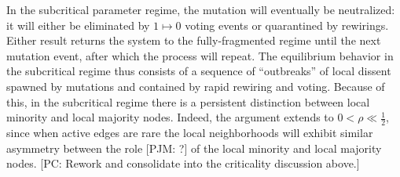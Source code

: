 \documentclass[review, onefignum, onetabnum]{siamart171218}
\newcommand{\pjm}[1]{{\color{blue}[PJM: #1]}}
\newcommand{\pc}[1]{{\color{comment_purple}[PC: #1]}}
\begin{document}
        In the subcritical parameter regime,  the mutation will eventually be neutralized: it will either be eliminated by $1\mapsto 0$ voting events or quarantined by rewirings. 
		Either result returns the system to the fully-fragmented regime until the next mutation event, after which the process will repeat. 
		The equilibrium behavior in the subcritical regime thus consists of a sequence of  ``outbreaks'' of local dissent spawned by mutations and contained by rapid rewiring and voting. 
		Because of this, in the subcritical regime there is a persistent distinction between local minority and local majority nodes. 
		Indeed, the argument extends to $0 < \rho \ll \frac{1}{2}$, since when active edges are rare the local neighborhoods will exhibit similar asymmetry between the role \pjm{?} of the local minority and local majority nodes. \pc{Rework and consolidate into the criticality discussion above.}
        
\end{document}
